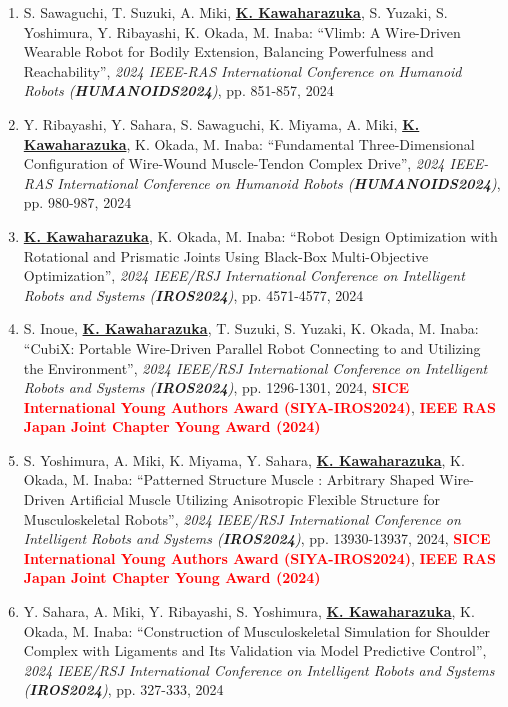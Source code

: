 \documentclass[letterpaper]{article}
\begin{document}
\begin{enumerate}
\item S. Sawaguchi, T. Suzuki, A. Miki, \underline{\textbf{K. Kawaharazuka}}, S. Yuzaki, S. Yoshimura, Y. Ribayashi, K. Okada, M. Inaba: ``Vlimb: A Wire-Driven Wearable Robot for Bodily Extension, Balancing Powerfulness and Reachability'', \textit{2024 IEEE-RAS International Conference on Humanoid Robots (\textit{\textbf{HUMANOIDS2024}})}, pp. 851-857, 2024
\item Y. Ribayashi, Y. Sahara, S. Sawaguchi, K. Miyama, A. Miki, \underline{\textbf{K. Kawaharazuka}}, K. Okada, M. Inaba: ``Fundamental Three-Dimensional Configuration of Wire-Wound Muscle-Tendon Complex Drive'', \textit{2024 IEEE-RAS International Conference on Humanoid Robots (\textit{\textbf{HUMANOIDS2024}})}, pp. 980-987, 2024
\item \underline{\textbf{K. Kawaharazuka}}, K. Okada, M. Inaba: ``Robot Design Optimization with Rotational and Prismatic Joints Using Black-Box Multi-Objective Optimization'', \textit{2024 IEEE/RSJ International Conference on Intelligent Robots and Systems (\textit{\textbf{IROS2024}})}, pp. 4571-4577, 2024
\item S. Inoue, \underline{\textbf{K. Kawaharazuka}}, T. Suzuki, S. Yuzaki, K. Okada, M. Inaba: ``CubiX: Portable Wire-Driven Parallel Robot Connecting to and Utilizing the Environment'', \textit{2024 IEEE/RSJ International Conference on Intelligent Robots and Systems (\textit{\textbf{IROS2024}})}, pp. 1296-1301, 2024, \textbf{\textcolor{red}{SICE International Young Authors Award (SIYA-IROS2024)}}, \textbf{\textcolor{red}{IEEE RAS Japan Joint Chapter Young Award (2024)}}
\item S. Yoshimura, A. Miki, K. Miyama, Y. Sahara, \underline{\textbf{K. Kawaharazuka}}, K. Okada, M. Inaba: ``Patterned Structure Muscle : Arbitrary Shaped Wire-Driven Artificial Muscle Utilizing Anisotropic Flexible Structure for Musculoskeletal Robots'', \textit{2024 IEEE/RSJ International Conference on Intelligent Robots and Systems (\textit{\textbf{IROS2024}})}, pp. 13930-13937, 2024, \textbf{\textcolor{red}{SICE International Young Authors Award (SIYA-IROS2024)}}, \textbf{\textcolor{red}{IEEE RAS Japan Joint Chapter Young Award (2024)}}
\item Y. Sahara, A. Miki, Y. Ribayashi, S. Yoshimura, \underline{\textbf{K. Kawaharazuka}}, K. Okada, M. Inaba: ``Construction of Musculoskeletal Simulation for Shoulder Complex with Ligaments and Its Validation via Model Predictive Control'', \textit{2024 IEEE/RSJ International Conference on Intelligent Robots and Systems (\textit{\textbf{IROS2024}})}, pp. 327-333, 2024

\end{enumerate}
\end{document}
